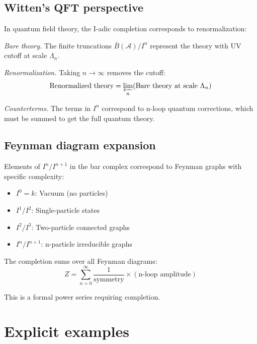 \subsection{Witten's QFT perspective}

\begin{interpretation}\label{interp:completion-renorm}
In quantum field theory, the I-adic completion corresponds to renormalization:

\emph{Bare theory.}
The finite truncations $\bar{B}(\mathcal{A})/I^n$ represent the theory with UV cutoff at scale $\Lambda_n$.

\emph{Renormalization.}
Taking $n \to \infty$ removes the cutoff:
\[\text{Renormalized theory} = \varprojlim_n (\text{Bare theory at scale } \Lambda_n)\]

\emph{Counterterms.}
The terms in $I^n$ correspond to n-loop quantum corrections, which must be summed to get the full quantum theory.
\end{interpretation}

\subsection{Feynman diagram expansion}

\begin{remark}\label{rem:feynman-conilpotent}
Elements of $I^n/I^{n+1}$ in the bar complex correspond to Feynman graphs with specific complexity:

\begin{itemize}
\item $I^0 = k$: Vacuum (no particles)
\item $I^1/I^2$: Single-particle states
\item $I^2/I^3$: Two-particle connected graphs
\item $I^n/I^{n+1}$: n-particle irreducible graphs
\end{itemize}

The completion sums over all Feynman diagrams:
\[Z = \sum_{n=0}^{\infty} \frac{1}{\text{symmetry}} \times (\text{n-loop amplitude})\]

This is a formal power series requiring completion.
\end{remark}

\section{Explicit examples}

